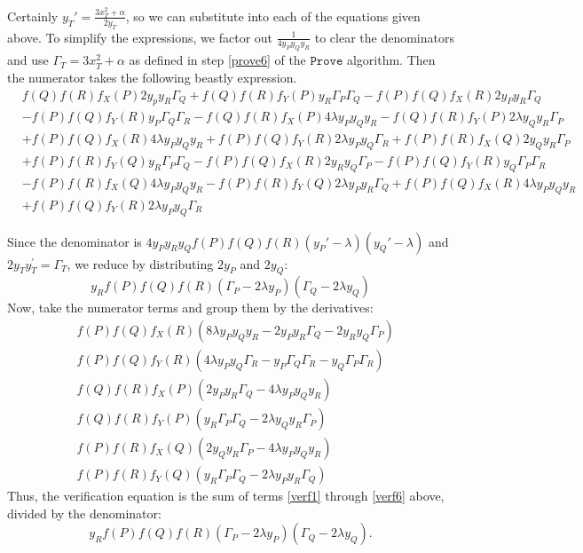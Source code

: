 \documentclass[11pt,letterpaper]{article}
\theoremstyle{definition}
\newcommand{\6}{\mathbf}
\newcommand{\7}{\mathcal}
\begin{document}
Certainly $y_T' = \frac{3x_T^2 + \alpha}{2y_T}$, so we can substitute into each of the equations given above. To simplify the expressions, we factor out $\frac{1}{4y_Py_Qy_R}$ to clear the denominators and use $\Gamma_T = 3x_T^2 + \alpha$ as defined in step \ref{prove6} of the $\texttt{Prove}$ algorithm.
Then the numerator takes the following beastly expression.
\begin{align}
& f(Q)f(R)f_X(P)2y_py_R \Gamma_Q +
f(Q)f(R)f_Y(P)y_R\Gamma_P\Gamma_Q - 
f(P)f(Q)f_X(R)2y_Py_R\Gamma_Q  \nonumber \\& - f(P)f(Q)f_Y(R)y_P \Gamma_Q \Gamma_R -
f(Q)f(R)f_X(P)4 \lambda y_P y_Q y_R -
f(Q)f(R)f_Y(P)2 \lambda y_Q y_R \Gamma_P   \nonumber \\& +
f(P)f(Q)f_X(R)4 \lambda y_P y_Q y_R + 
f(P)f(Q)f_Y(R) 2 \lambda y_P y_Q \Gamma_R +  f(P)f(R)f_X(Q)2y_Q y_R \Gamma_P   \nonumber  \\& +f(P)f(R)f_Y(Q)y_R \Gamma_P \Gamma_Q - f(P)f(Q)f_X(R)2 y_R y_Q \Gamma_P - f(P)f(Q)f_Y(R) y_Q \Gamma_P \Gamma_R   \nonumber \\ 
& -f(P)f(R)f_X(Q) 4 \lambda y_P y_Q y_R - f(P)f(R)f_Y(Q)2 \lambda y_P y_R \Gamma_Q + f(P)f(Q)f_X(R) 4 \lambda y_P y_Q y_R   \nonumber \\& +f(P)f(Q)f_Y(R)2 \lambda y_P y_Q \Gamma_R \label{verifnumerator}
\end{align}


Since the denominator is
$4 y_P y_R y_Q f(P)f(Q)f(R)(y_P' - \lambda)(y_Q' - \lambda)$ and $2y_Ty_T^\prime = \Gamma_T$, we reduce by distributing $2y_P$ and $2y_Q$:
$$y_R f(P) f(Q) f(R)(\Gamma_P - 2 \lambda y_P)(\Gamma_Q - 2 \lambda y_Q)$$
Now, take the numerator terms and group them by the derivatives:
\begin{align}
 & f(P)f(Q)f_X(R)(8 \lambda y_P y_Q y_R - 2 y_P y_R \Gamma_Q - 2 y_R y_Q \Gamma_P) \label{verf1} \\
 & f(P)f(Q)f_Y(R)(4 \lambda y_P y_Q \Gamma_R - y_P \Gamma_Q \Gamma_R - y_Q \Gamma_P \Gamma_R) \label{verf2} \\
 & f(Q)f(R)f_X(P)(2 y_P y_R \Gamma_Q - 4 \lambda y_P y_Q y_R) \label{verf3} \\
 & f(Q)f(R)f_Y(P)(y_R \Gamma_P \Gamma_Q - 2 \lambda y_Q y_R \Gamma_P) \label{verf4} \\
 & f(P)f(R)f_X(Q)(2 y_Q y_R \Gamma_P - 4 \lambda y_P y_Q y_R) \label{verf5} \\
 & f(P)f(R)f_Y(Q)(y_R \Gamma_P \Gamma_Q - 2 \lambda y_P y_R \Gamma_Q) \label{verf6}
\end{align}
Thus, the verification equation is the sum of terms \ref{verf1} through \ref{verf6} above, divided by the denominator:
$$y_R f(P) f(Q) f(R)(\Gamma_P - 2 \lambda y_P)(\Gamma_Q - 2 \lambda y_Q).$$ 
\end{document}
